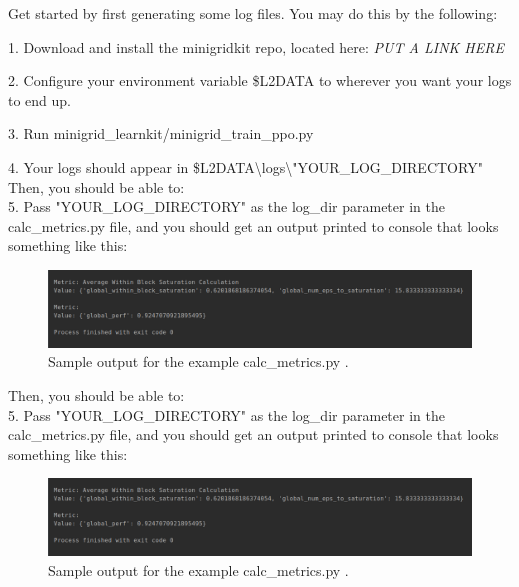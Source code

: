 Get started by first generating some log files. You may do this by the following:

1. Download and install the minigridkit repo, located here: \textit{PUT A LINK HERE}

2. Configure your environment variable \$L2DATA to wherever you want your logs to end up.

3. Run minigrid\_learnkit/minigrid\_train\_ppo.py

4. Your logs should appear in \$L2DATA\textbackslash logs\textbackslash  "YOUR\_LOG\_DIRECTORY"\\[0.1in]


Then, you should be able to:\\[0.1in]


5. Pass "YOUR\_LOG\_DIRECTORY" as the log\_dir parameter in the calc\_metrics.py file, and you should get an output printed to console that looks something like this: 


\begin{figure}[h]
	\centering
	\includegraphics[width=0.85\columnwidth]{sections/figs/calc_metrics_output.png}
	\caption{Sample output for the example calc\_metrics.py .}
	\label{fig:calcmetricsoutput}
\end{figure}

Then, you should be able to:\\[0.1in]


5. Pass "YOUR\_LOG\_DIRECTORY" as the log\_dir parameter in the calc\_metrics.py file, and you should get an output printed to console that looks something like this: 


\begin{figure}[h]
	\centering
	\includegraphics[width=0.85\columnwidth]{sections/figs/calc_metrics_output.png}
	\caption{Sample output for the example calc\_metrics.py .}
	\label{fig:calcmetricsoutput}
\end{figure}

